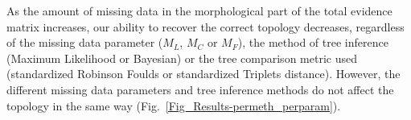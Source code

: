 \documentclass[12pt,letterpaper]{article}
\begin{document}
As the amount of missing data in the morphological part of the total evidence matrix increases, our ability to recover the correct topology decreases, regardless of the missing data parameter ($M_{L}$, $M_{C}$ or $M_{F}$), the method of tree inference (Maximum Likelihood or Bayesian) or the tree comparison metric used (standardized Robinson Foulds or standardized Triplets distance). 
However, the different missing data parameters and tree inference methods do not affect the topology in the same way (Fig.~\ref{Fig_Results-permeth_perparam}). %

\end{document}
